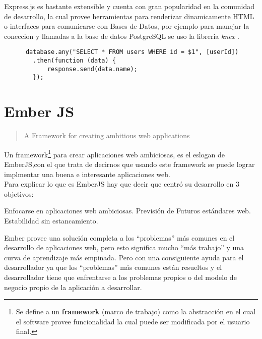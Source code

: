 
    Express.js es bastante extensible y cuenta con gran popularidad en la comunidad de desarrollo, la cual provee herramientas para renderizar dinamicamente HTML o interfaces para comunicarse con Bases de Datos, por ejemplo para manejar la coneccion y llamadas a la base de datos PostgreSQL se uso la libreria \emph{knex} .

    \begin{verbatim}
      database.any("SELECT * FROM users WHERE id = $1", [userId])
        .then(function (data) {
            response.send(data.name);
        });
    \end{verbatim}


  \section{Ember JS}
  \label{sec:ember_js}

    \begin{quote}
    \centering
    A Framework for creating ambitious web applications
    \end{quote}


Un framework\footnote{Se define a un \textbf{framework} (marco de trabajo) como la abstracción en el cual el software provee funcionalidad la cual puede ser modificada por el usuario final.} para crear aplicaciones web ambiciosas, es el eslogan de EmberJS,con el que trata de decirnos que usando este framework se puede lograr implmentar una buena e interesante aplicaciones web.\\

Para explicar lo que es EmberJS hay que decir que centró su desarrollo en 3 objetivos:

Enfocarse en aplicaciones web ambiciosas. %
Previsión de Futuros estándares web. %
Estabilidad sin estancamiento.\cite{ember_antidote} %


Ember provee una solución completa a los ``problemas'' más comunes en el desarrollo de aplicaciones web, pero esto significa mucho ``más trabajo'' y una curva de aprendizaje más empinada. Pero con una consiguiente ayuda para el desarrollador ya que los ``problemas'' más comunes están resueltos y el desarrollador tiene que enfrentarse a los problemas propios o del modelo de negocio propio de la aplicación a desarrollar.\\

